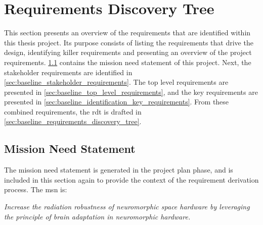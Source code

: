 \chapter{Requirements Discovery Tree}\label{chap:baseline_requirements_discovery_tree}
This section presents an overview of the requirements that are identified within this thesis project. Its purpose consists of listing the requirements that drive the design, identifying killer requirements and presenting an overview of the project requirements. \cref{sec:baseline_mission_need_statement} contains the mission need statement of this project. Next, the stakeholder requirements are identified in \cref{sec:baseline_stakeholder_requirements}. The top level requirements are presented in \cref{sec:baseline_top_level_requirements}, and the key requirements are presented in \cref{sec:baseline_identification_key_requirements}. From these combined requirements, the \acrlong{rdt} is drafted in \cref{sec:baseline_requirements_discovery_tree}.

\section{Mission Need Statement}\label{sec:baseline_mission_need_statement}
The mission need statement is generated in the project plan phase, and is included in this section again to provide the context of the requirement derivation process. The \acrshort{msn} is:

\textit{Increase the radiation robustness of neuromorphic space hardware by leveraging the principle of brain adaptation in neuromorphic hardware.}

